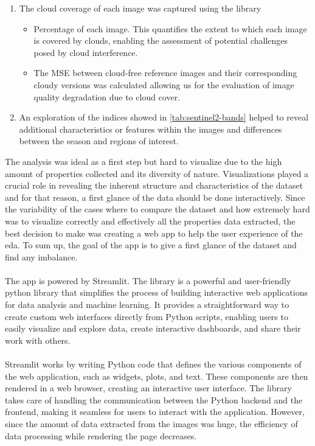 \begin{enumerate}
	\item  The cloud coverage of each image was captured using the library  
	\begin{itemize}
		\item Percentage of each image. This quantifies the extent to which each image is covered by clouds, enabling the assessment of potential challenges posed by cloud interference.
		\item The MSE between cloud-free reference images and their corresponding cloudy versions was calculated allowing us for the evaluation of image quality degradation due to cloud cover.
	\end{itemize}
	\item An exploration of the indices showed in \ref{tab:sentinel2-bands} helped to reveal additional characteristics or features within the images and differences between the season and regions of interest.
\end{enumerate}
The analysis was ideal as a first step but hard to visualize due to the high amount of properties collected and its diversity of nature. Visualizations played a crucial role in revealing the inherent structure and characteristics of the dataset and for that reason, a first glance of the data should be done interactively. 
Since the variability of the cases where to compare the dataset and how extremely hard was to visualize correctly and effectively all the properties data extracted, the best decision to make was creating a web app to help the user experience of the \gls{eda}. To sum up, the goal of the app is to give a first glance of the dataset and find any imbalance. 
\\
\\
The app is powered by Streamlit. The library is a powerful and user-friendly python library that simplifies the process of building interactive web applications for data analysis and machine learning. It provides a straightforward way to create custom web interfaces directly from Python scripts, enabling users to easily visualize and explore data, create interactive dashboards, and share their work with others.
\\\\
Streamlit works by writing Python code that defines the various components of the web application, such as widgets, plots, and text. These components are then rendered in a web browser, creating an interactive user interface. The library takes care of handling the communication between the Python backend and the frontend, making it seamless for users to interact with the application. However, since the amount of data extracted from the images was huge, the efficiency of data processing while rendering the page decreases.
